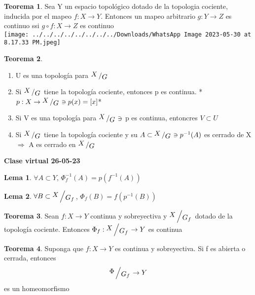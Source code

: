 \documentclass{article}
\theoremstyle{definition}
\newtheorem{theorem}{Teorema}[section]
\newtheorem{lemma}{Lema}[section]
\newcommand{\bigslant}[2]{{\raisebox{.2em}{$#1$}\left/\raisebox{-.2em}{$#2$}\right.}}
\begin{document}

\begin{theorem}
	Sea Y un espacio topológico dotado de la topologia cociente, inducida por el mapeo $f:X\to Y$. Entonces un mapeo arbitrario $g:Y\to Z$ es continuo ssi $g\circ f:X\to Z$ es continuo\\
\texttt{[image: ../../../../../../../../Downloads/WhatsApp Image 2023-05-30 at 8.17.33 PM.jpeg]} 
\end{theorem}


\begin{theorem}
	\begin{enumerate}
		\item U es una topología para $\bigslant{X}{G}$
		\item Si $\bigslant{X}{G}$ tiene la topología cociente, entonces p es continua. *$p:X\to\bigslant{X}{G}\ni p(x)=[x]$*
		\item Si V es una topología para $\bigslant{X}{G}\ni$ p es continua, entoncres $V\subset U$
		\item Si $\bigslant{X}{G}$ tiene la topología cociente y su $A\subset \bigslant{X}{G}\ni p^{-1}(A)$ es cerrado de X $\Rightarrow$ A es cerrado en $\bigslant{X}{G}$
	\end{enumerate}
\end{theorem}


\textbf{Clase virtual 26-05-23}


\begin{lemma}
	$\forall A\subset Y$, $\Phi_f^{-1}(A)=p(f^{-1}(A))$
\end{lemma}


\begin{lemma}
	$\forall B\subset \bigslant{X}{G_f}$, $\Phi_f(B)=f(p^{-1}(B))$
\end{lemma}


\begin{theorem}
	Sean $f:X\to Y$ continua y sobreyectiva y  $\bigslant{X}{G_f}$ dotado de la topología cociente. Entonces $\Phi_f:\bigslant{X}{G_f}\to Y$ es continua
\end{theorem}


\begin{theorem}
	Suponga que $f:X\to Y$ es continua y sobreyectiva. Si f es abierta o cerrada, entonces 
	\[ \bigslant{\Phi}{G_f}\to Y\]
	es un homeomorfismo
\end{theorem}
\end{document}
